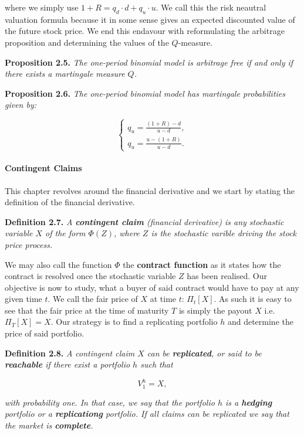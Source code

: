 \documentclass[
]{article}
\begin{document}
where we simply use \(1+R=q_d\cdot d+q_u\cdot u\). We call this the risk
neautral valuation formula because it in some sense gives an expected
discounted value of the future stock price. We end this endavour with
reformulating the arbitrage proposition and determining the values of
the \(Q\)-measure.

\textbf{Proposition 2.5.} \emph{The one-period binomial model is
arbitrage free if and only if there exists a martingale measure \(Q\).}

\textbf{Proposition 2.6.} \emph{The one-period binomial model has
martingale probabilities given by:}

\[\left\{\begin{matrix}q_u=\frac{(1+R)-d}{u-d},\\ q_u=\frac{u-(1+R)}{u-d}.\end{matrix}\right.\]

\hypertarget{contingent-claims}{%
\paragraph{Contingent Claims}\label{contingent-claims}}

This chapter revolves around the financial derivative and we start by
stating the definition of the financial derivative.

\textbf{Definition 2.7.} \emph{A \textbf{contingent claim} (financial
derivative) is \emph{any} stochastic variable \(X\) of the form
\(\Phi(Z)\), where \(Z\) is the stochastic varible driving the stock
price process.}

We may also call the function \(\Phi\) the \textbf{contract function} as
it states how the contract is resolved once the stochastic variable
\(Z\) has been realised. Our objective is now to study, what a buyer of
said contract would have to pay at any given time \(t\). We call the
fair price of \(X\) at time \(t\): \(\Pi_t[X]\). As such it is easy to
see that the fair price at the time of maturity \(T\) is simply the
payout \(X\) i.e.~\(\Pi_T[X]=X\). Our strategy is to find a replicating
portfolio \(h\) and determine the price of said portfolio.

\textbf{Definition 2.8.} \emph{A contingent claim \(X\) can be
\textbf{replicated}, or said to be \textbf{reachable} if there exist a
portfolio \(h\) such that}

\[
V_1^h=X,
\]

\emph{with probability one. In that case, we say that the portfolio
\(h\) is a \textbf{hedging} portfolio or a \textbf{replicationg}
portfolio. If all claims can be replicated we say that the market is
\textbf{complete}.}
\end{document}
